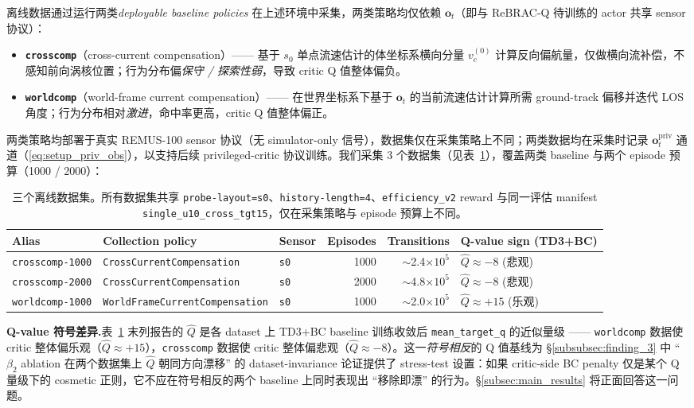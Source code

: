 离线数据通过运行两类\emph{deployable baseline policies} 在上述环境中采集，两类策略均仅依赖 $\mathbf{o}_t$（即与 ReBRAC-Q 待训练的 actor 共享 sensor 协议）：
\begin{itemize}
    \item \textbf{\texttt{crosscomp}}（cross-current compensation）—— 基于 $s_0$ 单点流速估计的体坐标系横向分量 $v_c^{(0)}$ 计算反向偏航量，仅做横向流补偿，不感知前向涡核位置；行为分布偏\emph{保守 / 探索性弱}，导致 critic Q 值整体偏负。
    \item \textbf{\texttt{worldcomp}}（world-frame current compensation）—— 在世界坐标系下基于 $\mathbf{o}_t$ 的当前流速估计计算所需 ground-track 偏移并迭代 LOS 角度；行为分布相对\emph{激进}，命中率更高，critic Q 值整体偏正。
\end{itemize}
两类策略均部署于真实 REMUS-100 sensor 协议（无 simulator-only 信号），数据集仅在采集策略上不同；两类数据均在采集时记录 $\mathbf{o}_t^{\mathrm{priv}}$ 通道（\eqref{eq:setup_priv_obs}），以支持后续 privileged-critic 协议训练。我们采集 3 个数据集（见表~\ref{tab:dataset_matrix}），覆盖两类 baseline 与两个 episode 预算（1000 / 2000）：

\begin{table}[t]
\centering
\caption{三个离线数据集。所有数据集共享 \texttt{probe-layout=s0}、\texttt{history-length=4}、\texttt{efficiency\_v2} reward 与同一评估 manifest \texttt{single\_u10\_cross\_tgt15}，仅在采集策略与 episode 预算上不同。}
\label{tab:dataset_matrix}
\small
\begin{tabular}{lllrrl}
\toprule
\textbf{Alias} & \textbf{Collection policy} & \textbf{Sensor} & \textbf{Episodes} & \textbf{Transitions} & \textbf{Q-value sign (TD3+BC)} \\
\midrule
\texttt{crosscomp-1000} & \texttt{CrossCurrentCompensation} & \texttt{s0} & 1000 & $\sim$2.4$\times 10^5$ & $\hat{Q} \approx -8$ (悲观) \\
\texttt{crosscomp-2000} & \texttt{CrossCurrentCompensation} & \texttt{s0} & 2000 & $\sim$4.8$\times 10^5$ & $\hat{Q} \approx -8$ (悲观) \\
\texttt{worldcomp-1000} & \texttt{WorldFrameCurrentCompensation} & \texttt{s0} & 1000 & $\sim$2.0$\times 10^5$ & $\hat{Q} \approx +15$ (乐观) \\
\bottomrule
\end{tabular}
\end{table}

\textbf{Q-value 符号差异.}\quad 表~\ref{tab:dataset_matrix} 末列报告的 $\hat{Q}$ 是各 dataset 上 TD3+BC baseline 训练收敛后 \texttt{mean\_target\_q} 的近似量级 —— \texttt{worldcomp} 数据使 critic 整体偏乐观（$\hat{Q} \approx +15$），\texttt{crosscomp} 数据使 critic 整体偏悲观（$\hat{Q} \approx -8$）。这一\emph{符号相反}的 Q 值基线为 \S\ref{subsubsec:finding_3} 中 ``$\beta_2$ ablation 在两个数据集上 $\hat{Q}$ 朝同方向漂移'' 的 dataset-invariance 论证提供了 stress-test 设置：如果 critic-side BC penalty 仅是某个 Q 量级下的 cosmetic 正则，它不应在符号相反的两个 baseline 上同时表现出 ``移除即漂'' 的行为。\S\ref{subsec:main_results} 将正面回答这一问题。

